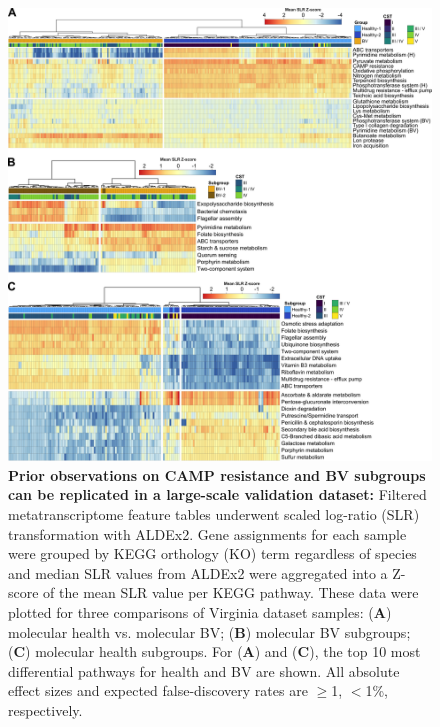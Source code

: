 \documentclass[sn-mathphys,Numbered]{sn-jnl}%
\begin{document}
\begin{figure}[H]
    \centering
    \includegraphics[scale = 0.835]{0_multipanel_fig5.png}
    \caption{\textbf{Prior observations on CAMP resistance and BV subgroups can be replicated in a large-scale validation dataset:} Filtered metatranscriptome feature tables underwent scaled log-ratio (SLR) transformation with ALDEx2. Gene assignments for each sample were grouped by KEGG orthology (KO) term regardless of species and median SLR values from ALDEx2 were aggregated into a Z-score of the mean SLR value per KEGG pathway. These data were plotted for three comparisons of Virginia dataset samples: (\textbf{A}) molecular health vs. molecular BV; (\textbf{B}) molecular BV subgroups; (\textbf{C}) molecular health subgroups. For (\textbf{A}) and (\textbf{C}), the top 10 most differential pathways for health and BV are shown. All absolute effect sizes and expected false-discovery rates are $\geq$1, $<$1\%, respectively.}
    \label{fig:figValidation}
\end{figure}
\end{document}
